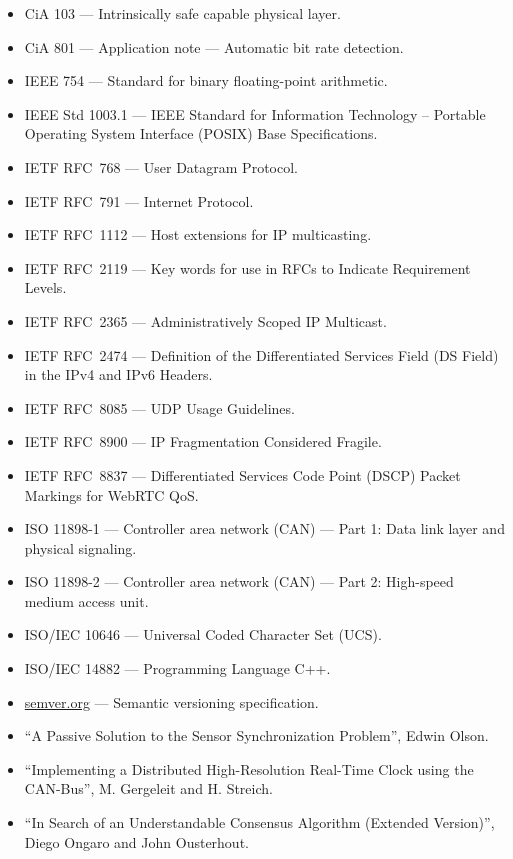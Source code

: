 \begin{itemize}
    \item CiA 103 --- Intrinsically safe capable physical layer.
    \item CiA 801 --- Application note --- Automatic bit rate detection.

    \item IEEE 754 --- Standard for binary floating-point arithmetic.
    \item IEEE Std 1003.1 --- IEEE Standard for Information Technology --
          Portable Operating System Interface (POSIX) Base Specifications.

    \item IETF RFC~768 --- User Datagram Protocol.
    \item IETF RFC~791 --- Internet Protocol.
    \item IETF RFC~1112 --- Host extensions for IP multicasting.
    \item IETF RFC~2119 --- Key words for use in RFCs to Indicate Requirement Levels.
    \item IETF RFC~2365 --- Administratively Scoped IP Multicast.
    \item IETF RFC~2474 --- Definition of the Differentiated Services Field (DS Field) in the IPv4 and IPv6 Headers.
    \item IETF RFC~8085 --- UDP Usage Guidelines.
    \item IETF RFC~8900 --- IP Fragmentation Considered Fragile.
    \item IETF RFC~8837 --- Differentiated Services Code Point (DSCP) Packet Markings for WebRTC QoS.

    \item ISO 11898-1 --- Controller area network (CAN) --- Part 1: Data link layer and physical signaling.
    \item ISO 11898-2 --- Controller area network (CAN) --- Part 2: High-speed medium access unit.
    \item ISO/IEC 10646 --- Universal Coded Character Set (UCS).
    \item ISO/IEC 14882 --- Programming Language C++.

    \item \href{http://semver.org}{semver.org} --- Semantic versioning specification.

    \item ``A Passive Solution to the Sensor Synchronization Problem'', Edwin Olson.
    \item ``Implementing a Distributed High-Resolution Real-Time Clock using the CAN-Bus'', M. Gergeleit and H. Streich.
    \item ``In Search of an Understandable Consensus Algorithm (Extended Version)'', Diego Ongaro and John Ousterhout.
\end{itemize}

